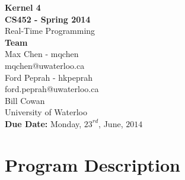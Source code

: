 \documentclass[12pt]{article}
\begin{document}
\thispagestyle{empty}
\begin{center}
  {\bf\Large Kernel 4}\\
  {\bf\large CS452 - Spring 2014}\\
  Real-Time Programming\vspace{5cm}\\
  {\bf Team }\\
  Max Chen - mqchen\\
  mqchen@uwaterloo.ca\\[1\baselineskip]
  Ford Peprah - hkpeprah\\
  ford.peprah@uwaterloo.ca\vspace{5cm}\\
  Bill Cowan\\
  University of Waterloo\\
  {\bf Due Date:} Monday, $23^{rd}$, June, $2014$
\end{center}
\newpage
\thispagestyle{empty}
\tableofcontents
\newpage
\section{Program Description}
\end{document}
